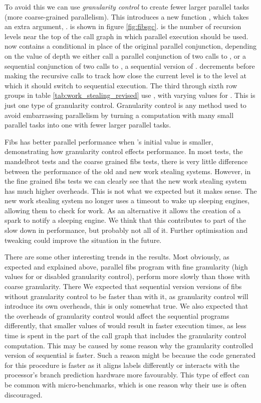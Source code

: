 To avoid this we can use \emph{granularity control} to create fewer larger
parallel tasks (more coarse-grained parallelism).
This introduces a new function \fibsgc, which takes an extra argument,
\Depth.
\fibsgc is shown in figure \ref{fig:fibsgc}.
\Depth is the number of recursion levels near the top of the call graph in
which parallel execution should be used.
\fibsgc now contains a conditional in place of the original parallel
conjunction,
depending on the value of depth we either call a parallel conjunction of two
calls to \fibsgc,
or a sequential conjunction of two calls to \fibsseq, a sequential version of
\fibs.
\fibsgc decrements \Depth before making the recursive calls to track how
close the current level is to the level at which it should switch to
sequential execution.
The third through sixth row groups in table
\ref{tab:work_stealing_revised} use \fibsgc, with varying values for
\Depth.
This is just one type of granularity control.
Granularity control is any method used to avoid
embarrassing parallelism by turning a computation with 
many small parallel tasks into one with fewer larger parallel tasks.

Fibs has better parallel performance when \Depth's initial value is
smaller,
demonstrating how granularity control effects performance.
In most tests,
the mandelbrot tests and the coarse grained fibs tests,
there is very little difference between the performance of the old and new
work stealing systems.
However,
in the fine grained fibs tests we can clearly see that the new work stealing
system has much higher overheads.
This is not what we expected but it makes sense.
The new work stealing system no longer uses a timeout to wake up sleeping
engines, allowing them to check for work.
As an alternative it allows the creation of a spark to notify a sleeping
engine.
We think that this contributes to part of the slow down in performance,
but probably not all of it.
Further optimisation and tweaking could improve the situation in the future.

There are some other interesting trends in the results.
Most obviously,
as expected and explained above,
parallel fibs program with fine granularity
(high values for \Depth or disabled granularity control),
perform more slowly than those with coarse granularity.
There
We expected that sequential version versions of fibs without granularity
control to be faster than with it,
as granularity control will introduce its own overheads, this is only
somewhat true.
We also expected that the overheads of granularity control would affect the
sequential programs differently,
that smaller values of \Depth would result in faster execution times,
as less time is spent in the part of the call graph that includes the
granularity control computation.
This may be caused by some reason why the granularity controlled version of
sequential \fibs is faster.
Such a reason might be because the code generated for this procedure is
faster as it aligns labels differently or interacts with the processor's
branch prediction hardware more favourably.
This type of effect can be common with micro-benchmarks,
which is one reason why their use is often discouraged.

